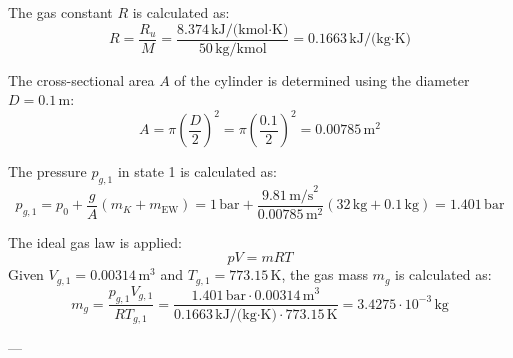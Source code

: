 The gas constant \( R \) is calculated as:  
\[
R = \frac{R_u}{M} = \frac{8.374 \, \text{kJ/(kmol·K)}}{50 \, \text{kg/kmol}} = 0.1663 \, \text{kJ/(kg·K)}
\]

The cross-sectional area \( A \) of the cylinder is determined using the diameter \( D = 0.1 \, \text{m} \):  
\[
A = \pi \left(\frac{D}{2}\right)^2 = \pi \left(\frac{0.1}{2}\right)^2 = 0.00785 \, \text{m}^2
\]

The pressure \( p_{g,1} \) in state 1 is calculated as:  
\[
p_{g,1} = p_0 + \frac{g}{A} (m_K + m_{\text{EW}}) = 1 \, \text{bar} + \frac{9.81 \, \text{m/s}^2}{0.00785 \, \text{m}^2} (32 \, \text{kg} + 0.1 \, \text{kg}) = 1.401 \, \text{bar}
\]

The ideal gas law is applied:  
\[
pV = mRT
\]
Given \( V_{g,1} = 0.00314 \, \text{m}^3 \) and \( T_{g,1} = 773.15 \, \text{K} \), the gas mass \( m_g \) is calculated as:  
\[
m_g = \frac{p_{g,1} V_{g,1}}{R T_{g,1}} = \frac{1.401 \, \text{bar} \cdot 0.00314 \, \text{m}^3}{0.1663 \, \text{kJ/(kg·K)} \cdot 773.15 \, \text{K}} = 3.4275 \cdot 10^{-3} \, \text{kg}
\]

---